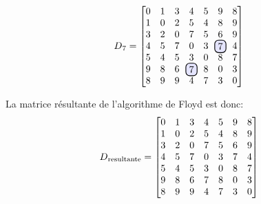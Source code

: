 \documentclass[devoir3.tex]{subfiles}
\begin{document}
\begin{align*}
	D\textsubscript{7} =
	\begin{bmatrix}
		0 		& 1 	  	& 3 		& 4 	  	  & 5		& 9	 	& 8 \\
		1 		& 0 		& 2		& 5		  & 4		& 8	 	& 9  \\
		3	 	& 2 		& 0 		& 7	 	  & 5 	  	& 6 		& 9   \\
		4 		& 5		& 7	  	& 0 	  	  & 3	  	& \hlight{7}	& 4 \\
		5  		& 4 	 	& 5 		& 3 	  	  & 0 	  	& 8 	 	& 7  \\
		9	 	& 8	 	& 6		& \hlight{7}	  & 8 	  	& 0 	 	& 3   \\
		8 		& 9 		& 9		& 4 	  	  & 7 	  	& 3 	 	& 0
	\end{bmatrix}
\end{align*}

La matrice résultante de l'algorithme de Floyd est donc:
\begin{align*}
	D\textsubscript{resultante} =
	\begin{bmatrix}
		0 		& 1 	  	& 3 		& 4 	  	  & 5		& 9	 	& 8 \\
		1 		& 0 		& 2		& 5		  & 4		& 8	 	& 9  \\
		3	 	& 2 		& 0 		& 7	 	  & 5 	  	& 6 		& 9   \\
		4 		& 5		& 7	  	& 0 	  	  & 3	  	& 7		& 4 \\
		5  		& 4 	 	& 5 		& 3 	  	  & 0 	  	& 8 	 	& 7  \\
		9	 	& 8	 	& 6		& 7		  & 8 	  	& 0 	 	& 3   \\
		8 		& 9 		& 9		& 4 	  	  & 7 	  	& 3 	 	& 0
	\end{bmatrix}
\end{align*}
\end{document}
